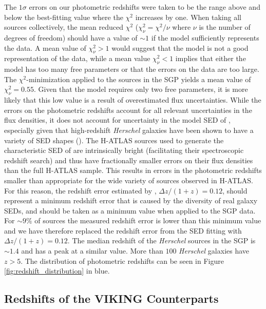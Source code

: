 The $1\sigma$ errors on our photometric redshifts were taken to be the range above and below the best-fitting value where the $\chi^2$ increases by one. When taking all sources collectively, the mean reduced $\chi^2$ ($\chi_\nu^2 = \chi^2/\nu$ where $\nu$ is the number of degrees of freedom) should have a value of $\sim 1$ if the model sufficiently represents the data. A mean value of $\chi_\nu^2 > 1$ would suggest that the model is not a good representation of the data, while a mean value $\chi_\nu^2 < 1$ implies that either the model has too many free parameters or that the errors on the data are too large. The $\chi^2$-minimization applied to the sources in the SGP yields a mean value of $\chi_\nu^2 = 0.55$. Given that the model requires only two free parameters, it is more likely that this low value is a result of overestimated flux uncertainties. While the errors on the photometric redshifts account for all relevant uncertainties in the flux densities, it does not account for uncertainty in the model SED of \citealt{Pearson_2013}, especially given that high-redshift \textit{Herschel} galaxies have been shown to have a variety of SED shapes (\citealt{Bakx_2018}). The H-ATLAS sources used to generate the characteristic SED of \citealt{Pearson_2013} are intrinsically bright (facilitating their spectroscopic redshift search) and thus have fractionally smaller errors on their flux densities than the full H-ATLAS sample. This results in errors in the photometric redshifts smaller than appropriate for the wide variety of sources observed in H-ATLAS. For this reason, the redshift error estimated by \citealt{Pearson_2013}, $\Delta z/(1+z) = 0.12$, should represent a minimum redshift error that is caused by the diversity of real galaxy SEDs, and should be taken as a minimum value when applied to the SGP data. For $\sim 9\%$ of sources the measured redshift error is lower than this minimum value and we have therefore replaced the redshift error from the SED fitting with $\Delta z/(1+z) = 0.12$. The median redshift of the \textit{Herschel} sources in the SGP is $\sim 1.4$ and has a peak at a similar value. More than $100$ \textit{Herschel} galaxies have $z > 5$. The distribution of photometric redshifts can be seen in Figure \ref{fig:redshift_distribution} in blue.

\subsection{Redshifts of the VIKING Counterparts}
\label{sec:phot_z_VIKING}


